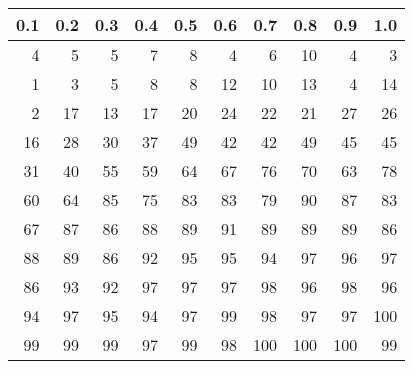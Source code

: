 \begin{tabular}{|rrrrrrrrrr}
  \hline
0.1 & 0.2 & 0.3 & 0.4 & 0.5 & 0.6 & 0.7 & 0.8 & 0.9 & 1.0 \\ 
  \hline
4 & 5 & 5 & 7 & 8 & 4 & 6 & 10 & 4 & 3 \\ 
  1 & 3 & 5 & 8 & 8 & 12 & 10 & 13 & 4 & 14 \\ 
  2 & 17 & 13 & 17 & 20 & 24 & 22 & 21 & 27 & 26 \\ 
  16 & 28 & 30 & 37 & 49 & 42 & 42 & 49 & 45 & 45 \\ 
  31 & 40 & 55 & 59 & 64 & 67 & 76 & 70 & 63 & 78 \\ 
  60 & 64 & 85 & 75 & 83 & 83 & 79 & 90 & 87 & 83 \\ 
  67 & 87 & 86 & 88 & 89 & 91 & 89 & 89 & 89 & 86 \\ 
  88 & 89 & 86 & 92 & 95 & 95 & 94 & 97 & 96 & 97 \\ 
  86 & 93 & 92 & 97 & 97 & 97 & 98 & 96 & 98 & 96 \\ 
  94 & 97 & 95 & 94 & 97 & 99 & 98 & 97 & 97 & 100 \\ 
  99 & 99 & 99 & 97 & 99 & 98 & 100 & 100 & 100 & 99 \\ 
   \hline
\end{tabular}
